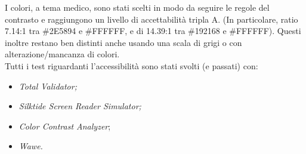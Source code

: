 I colori, a tema medico, sono stati scelti in modo da seguire le regole del contrasto e raggiungono un livello di accettabilità tripla A. (In particolare, ratio 7.14:1 tra \#2E5894 e \#FFFFFF, e di 14.39:1 tra \#192168 e \#FFFFFF).
Questi inoltre restano ben distinti anche usando una scala di grigi o con alterazione/mancanza di colori.\\


Tutti i test riguardanti l’accessibilità sono stati svolti (e passati) con:
\begin{itemize}
\item \textit{Total Validator;}
\item \textit{Silktide Screen Reader Simulator;}
\item \textit{Color Contrast Analyzer};
\item \textit{Wawe.}
\end{itemize}

